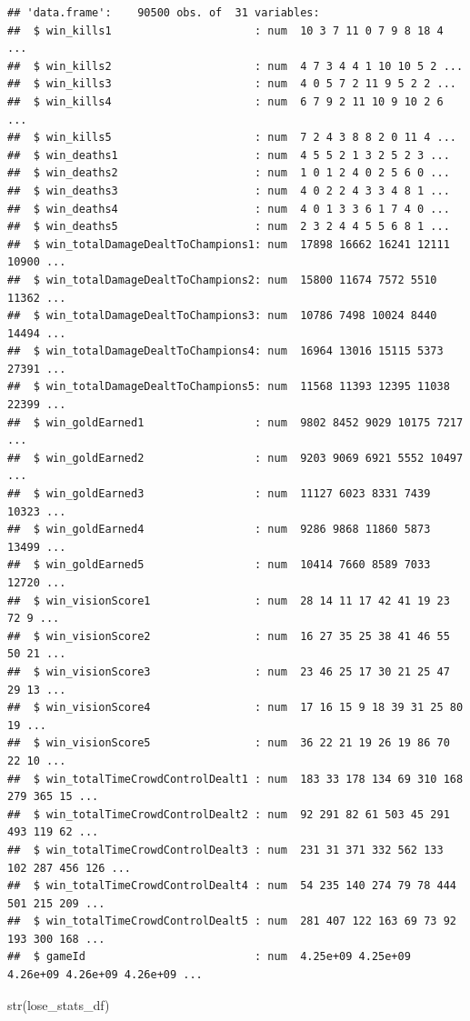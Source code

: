 \documentclass[
]{article}
\newenvironment{Shaded}{\begin{snugshade}}{\end{snugshade}}
\newcommand{\FunctionTok}[1]{\textcolor[rgb]{0.00,0.00,0.00}{#1}}
\newcommand{\NormalTok}[1]{#1}
\begin{document}
\begin{verbatim}
## 'data.frame':    90500 obs. of  31 variables:
##  $ win_kills1                      : num  10 3 7 11 0 7 9 8 18 4 ...
##  $ win_kills2                      : num  4 7 3 4 4 1 10 10 5 2 ...
##  $ win_kills3                      : num  4 0 5 7 2 11 9 5 2 2 ...
##  $ win_kills4                      : num  6 7 9 2 11 10 9 10 2 6 ...
##  $ win_kills5                      : num  7 2 4 3 8 8 2 0 11 4 ...
##  $ win_deaths1                     : num  4 5 5 2 1 3 2 5 2 3 ...
##  $ win_deaths2                     : num  1 0 1 2 4 0 2 5 6 0 ...
##  $ win_deaths3                     : num  4 0 2 2 4 3 3 4 8 1 ...
##  $ win_deaths4                     : num  4 0 1 3 3 6 1 7 4 0 ...
##  $ win_deaths5                     : num  2 3 2 4 4 5 5 6 8 1 ...
##  $ win_totalDamageDealtToChampions1: num  17898 16662 16241 12111 10900 ...
##  $ win_totalDamageDealtToChampions2: num  15800 11674 7572 5510 11362 ...
##  $ win_totalDamageDealtToChampions3: num  10786 7498 10024 8440 14494 ...
##  $ win_totalDamageDealtToChampions4: num  16964 13016 15115 5373 27391 ...
##  $ win_totalDamageDealtToChampions5: num  11568 11393 12395 11038 22399 ...
##  $ win_goldEarned1                 : num  9802 8452 9029 10175 7217 ...
##  $ win_goldEarned2                 : num  9203 9069 6921 5552 10497 ...
##  $ win_goldEarned3                 : num  11127 6023 8331 7439 10323 ...
##  $ win_goldEarned4                 : num  9286 9868 11860 5873 13499 ...
##  $ win_goldEarned5                 : num  10414 7660 8589 7033 12720 ...
##  $ win_visionScore1                : num  28 14 11 17 42 41 19 23 72 9 ...
##  $ win_visionScore2                : num  16 27 35 25 38 41 46 55 50 21 ...
##  $ win_visionScore3                : num  23 46 25 17 30 21 25 47 29 13 ...
##  $ win_visionScore4                : num  17 16 15 9 18 39 31 25 80 19 ...
##  $ win_visionScore5                : num  36 22 21 19 26 19 86 70 22 10 ...
##  $ win_totalTimeCrowdControlDealt1 : num  183 33 178 134 69 310 168 279 365 15 ...
##  $ win_totalTimeCrowdControlDealt2 : num  92 291 82 61 503 45 291 493 119 62 ...
##  $ win_totalTimeCrowdControlDealt3 : num  231 31 371 332 562 133 102 287 456 126 ...
##  $ win_totalTimeCrowdControlDealt4 : num  54 235 140 274 79 78 444 501 215 209 ...
##  $ win_totalTimeCrowdControlDealt5 : num  281 407 122 163 69 73 92 193 300 168 ...
##  $ gameId                          : num  4.25e+09 4.25e+09 4.26e+09 4.26e+09 4.26e+09 ...
\end{verbatim}

\begin{Shaded}
\begin{Highlighting}[]
\FunctionTok{str}\NormalTok{(lose\_stats\_df)}
\end{Highlighting}
\end{Shaded}
\end{document}
